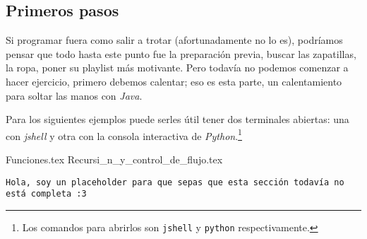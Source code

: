 \subsection{Primeros pasos}
  Si programar fuera como salir a trotar (afortunadamente no lo es), podríamos pensar que todo hasta
  este punto fue la preparación previa, buscar las zapatillas, la ropa, poner su playlist más 
  motivante.
  Pero todavía no podemos comenzar a hacer ejercicio, primero debemos calentar; eso es esta parte, 
  un calentamiento para soltar las manos con \textit{Java}.

  Para los siguientes ejemplos puede serles útil tener dos terminales abiertas: una con 
  \textit{jshell} y otra con la consola interactiva de \textit{Python}.\footnote{Los comandos para 
  abrirlos son \texttt{jshell} y \texttt{python} respectivamente.}

  {Funciones.tex}
  {Recursi_n_y_control_de_flujo.tex}
  \begin{center}
    \texttt{Hola, soy un placeholder para que sepas que esta sección todavía no está completa :3}
  \end{center}